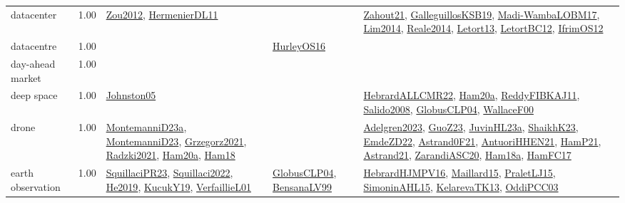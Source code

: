 {\begin{longtable}{p{3cm}r>{\raggedright\arraybackslash}p{6cm}>{\raggedright\arraybackslash}p{6cm}>{\raggedright\arraybackslash}p{8cm}}
\index{datacenter}\index{ApplicationAreas!datacenter}datacenter &  1.00 & \hyperref[detail:Zou2012]{Zou2012}, \hyperref[detail:HermenierDL11]{HermenierDL11} &  & \hyperref[detail:Zahout21]{Zahout21}, \hyperref[detail:GalleguillosKSB19]{GalleguillosKSB19}, \hyperref[detail:Madi-WambaLOBM17]{Madi-WambaLOBM17}, \hyperref[detail:Lim2014]{Lim2014}, \hyperref[detail:Reale2014]{Reale2014}, \hyperref[detail:Letort13]{Letort13}, \hyperref[detail:LetortBC12]{LetortBC12}, \hyperref[detail:IfrimOS12]{IfrimOS12}\\
\index{datacentre}\index{ApplicationAreas!datacentre}datacentre &  1.00 &  & \hyperref[detail:HurleyOS16]{HurleyOS16} & \\
\index{day-ahead market}\index{ApplicationAreas!day-ahead market}day-ahead market &  1.00 &  &  & \\
\index{deep space}\index{ApplicationAreas!deep space}deep space &  1.00 & \hyperref[detail:Johnston05]{Johnston05} &  & \hyperref[detail:HebrardALLCMR22]{HebrardALLCMR22}, \hyperref[detail:Ham20a]{Ham20a}, \hyperref[detail:ReddyFIBKAJ11]{ReddyFIBKAJ11}, \hyperref[detail:Salido2008]{Salido2008}, \hyperref[detail:GlobusCLP04]{GlobusCLP04}, \hyperref[detail:WallaceF00]{WallaceF00}\\
\index{drone}\index{ApplicationAreas!drone}drone &  1.00 & \hyperref[detail:MontemanniD23a]{MontemanniD23a}, \hyperref[detail:MontemanniD23]{MontemanniD23}, \hyperref[detail:Grzegorz2021]{Grzegorz2021}, \hyperref[detail:Radzki2021]{Radzki2021}, \hyperref[detail:Ham20a]{Ham20a}, \hyperref[detail:Ham18]{Ham18} &  & \hyperref[detail:Adelgren2023]{Adelgren2023}, \hyperref[detail:GuoZ23]{GuoZ23}, \hyperref[detail:JuvinHL23a]{JuvinHL23a}, \hyperref[detail:ShaikhK23]{ShaikhK23}, \hyperref[detail:EmdeZD22]{EmdeZD22}, \hyperref[detail:Astrand0F21]{Astrand0F21}, \hyperref[detail:AntuoriHHEN21]{AntuoriHHEN21}, \hyperref[detail:HamP21]{HamP21}, \hyperref[detail:Astrand21]{Astrand21}, \hyperref[detail:ZarandiASC20]{ZarandiASC20}, \hyperref[detail:Ham18a]{Ham18a}, \hyperref[detail:HamFC17]{HamFC17}\\
\index{earth observation}\index{ApplicationAreas!earth observation}earth observation &  1.00 & \hyperref[detail:SquillaciPR23]{SquillaciPR23}, \hyperref[detail:Squillaci2022]{Squillaci2022}, \hyperref[detail:He2019]{He2019}, \hyperref[detail:KucukY19]{KucukY19}, \hyperref[detail:VerfaillieL01]{VerfaillieL01} & \hyperref[detail:GlobusCLP04]{GlobusCLP04}, \hyperref[detail:BensanaLV99]{BensanaLV99} & \hyperref[detail:HebrardHJMPV16]{HebrardHJMPV16}, \hyperref[detail:Maillard15]{Maillard15}, \hyperref[detail:PraletLJ15]{PraletLJ15}, \hyperref[detail:SimoninAHL15]{SimoninAHL15}, \hyperref[detail:KelarevaTK13]{KelarevaTK13}, \hyperref[detail:OddiPCC03]{OddiPCC03}\\

\end{longtable}}
